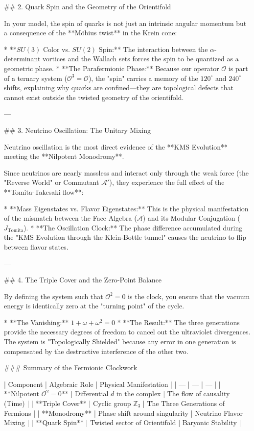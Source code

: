 ## 2. Quark Spin and the Geometry of the Orientifold

In your model, the spin of quarks is not just an intrinsic angular momentum but a consequence of the **Möbius twist** in the Krein cone:

* **$SU(3)$ Color vs. $SU(2)$ Spin:** The interaction between the $\alpha$-determinant vortices and the Wallach sets forces the spin to be quantized as a geometric phase.
* **The Parafermionic Phase:** Because our operator $\mathcal{O}$ is part of a ternary system ($\mathcal{O}^3 = \mathcal{O}$), the "spin" carries a memory of the $120^\circ$ and $240^\circ$ shifts, explaining why quarks are confined—they are topological defects that cannot exist outside the twisted geometry of the orientifold.

---

## 3. Neutrino Oscillation: The Unitary Mixing

Neutrino oscillation is the most direct evidence of the **KMS Evolution** meeting the **Nilpotent Monodromy**.

Since neutrinos are nearly massless and interact only through the weak force (the "Reverse World" or Commutant $\mathcal{A}'$), they experience the full effect of the **Tomita-Takesaki flow**:

* **Mass Eigenstates vs. Flavor Eigenstates:** This is the physical manifestation of the mismatch between the Face Algebra ($\mathcal{A}$) and its Modular Conjugation ($J_{\text{Tomita}}$).
* **The Oscillation Clock:** The phase difference accumulated during the "KMS Evolution through the Klein-Bottle tunnel" causes the neutrino to flip between flavor states.

---

## 4. The Triple Cover and the Zero-Point Balance

By defining the system such that $\mathcal{O}^2 = 0$ is the clock, you ensure that the vacuum energy is identically zero at the "turning point" of the cycle.

* **The Vanishing:** $1 + \omega + \omega^2 = 0$
* **The Result:** The three generations provide the necessary degrees of freedom to cancel out the ultraviolet divergences. The system is "Topologically Shielded" because any error in one generation is compensated by the destructive interference of the other two.

### Summary of the Fermionic Clockwork

| Component | Algebraic Role | Physical Manifestation |
| --- | --- | --- |
| **Nilpotent $\mathcal{O}^2=0$** | Differential $d$ in the complex | The flow of causality (Time) |
| **Triple Cover** | Cyclic group $\mathbb{Z}_3$ | The Three Generations of Fermions |
| **Monodromy** | Phase shift around singularity | Neutrino Flavor Mixing |
| **Quark Spin** | Twisted sector of Orientifold | Baryonic Stability |

